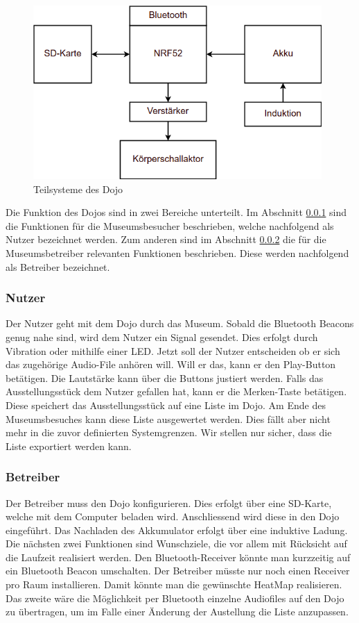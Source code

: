 \begin{figure}[H]
	\begin{center}
		\includegraphics[width=110mm]{data/Loesungskonzept_Teilsysteme.png}
		\caption{Teilsysteme des Dojo} %
		\label{fig:Teilsysteme}
	\end{center}
\end{figure}

Die Funktion des Dojos sind in zwei Bereiche unterteilt. Im Abschnitt \ref{sec:funktionNutzer} sind die Funktionen für die Museumsbesucher beschrieben, welche nachfolgend als Nutzer bezeichnet werden. Zum anderen sind im Abschnitt \ref{sec:funktionBetreiber} die für die Museumsbetreiber relevanten Funktionen beschrieben. Diese werden nachfolgend als Betreiber bezeichnet.

\subsubsection{Nutzer} \label{sec:funktionNutzer}
Der Nutzer geht mit dem Dojo durch das Museum. Sobald die Bluetooth Beacons genug nahe sind, wird dem Nutzer ein Signal gesendet. Dies erfolgt durch Vibration oder mithilfe einer LED. Jetzt soll der Nutzer entscheiden ob er sich das zugehörige Audio-File anhören will. Will er das, kann er den Play-Button betätigen. Die Lautstärke kann über die Buttons justiert werden. Falls das Ausstellungsstück dem Nutzer gefallen hat, kann er die Merken-Taste betätigen. Diese speichert das Ausstellungsstück auf eine Liste im Dojo. Am Ende des Museumsbesuches kann diese Liste ausgewertet werden. Dies fällt aber nicht mehr in die zuvor definierten Systemgrenzen. Wir stellen nur sicher, dass die Liste exportiert werden kann.
\subsubsection{Betreiber} \label{sec:funktionBetreiber}
Der Betreiber muss den Dojo konfigurieren. Dies erfolgt über eine SD-Karte, welche mit dem Computer beladen wird. Anschliessend wird diese in den Dojo eingeführt. Das Nachladen des Akkumulator erfolgt über eine induktive Ladung. Die nächsten zwei Funktionen sind Wunschziele, die vor allem mit Rücksicht auf die Laufzeit realisiert werden. Den Bluetooth-Receiver könnte man kurzzeitig auf ein Bluetooth Beacon umschalten. Der Betreiber müsste nur noch einen Receiver pro Raum installieren. Damit könnte man die gewünschte HeatMap realisieren. Das zweite wäre die Möglichkeit per Bluetooth einzelne Audiofiles auf den Dojo zu übertragen, um im Falle einer Änderung der Austellung die Liste anzupassen.
